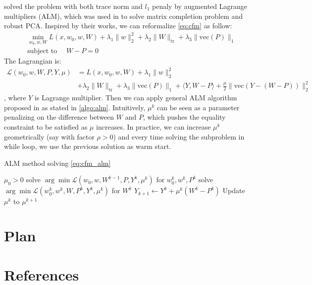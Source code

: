 \documentclass{article}
\newcommand{\tr}{\text{tr}}
\newcommand{\vecc}{\text{vec}}
\begin{document}
\cite{li2015conformal} solved the problem with both trace norm and $l_1$ penaly by augmented Lagrange multipliers (ALM), which was used in \cite{lin2010augmented} to solve matrix completion problem and robust PCA. Inspired by their works, we can reformalize \cref{eq:cfm} as follow:
\begin{align}
  &\min_{w_0, w, W} L(x, w_0, w, W) + \lambda_1 \|w\|_2^2 + \lambda_2 \|W\|_{\tr} + \lambda_3 \|\vecc(P)\|_1 \label{eq:cfm_alm} \\
  & \text{subject to }\quad W - P = 0
\end{align}
The Lagrangian is:
\begin{align}
  \mathcal{L}(w_0, w, W, P, Y, \mu) &= L(x, w_0, w, W) + \lambda_1 \|w\|_2^2 \nonumber \\
  &+ \lambda_2 \|W\|_{\tr} + \lambda_3 \|\vecc(P)\|_1 + \langle Y, W - P \rangle + \frac{\mu}{2} \|\vecc(Y - (W - P))\|_2^2 \label{eq:alm}
\end{align}
, where $Y$ is Lagrange multiplier. Then we can apply general ALM algorithm proposed in \cite{lin2010augmented} as stated in \cref{algo:alm}. Intuitively, $\mu^k$ can be seen as a parameter penalizing on the difference between $W$ and $P$, which pushes the equality constraint to be satisfied as $\mu$ increases. In practice, we can increase $\mu^k$ geometrically (say with factor $\rho > 0$) and every time solving the subproblem in while loop, we use the previous solution as warm start.
\begin{algorithm} 
  \caption{ALM method solving \cref{eq:cfm_alm}}
  \label{algo:alm}
  \begin{algorithmic}[1]
    \STATE $\mu_0 > 0$
      \STATE solve $\arg\min \mathcal{L}(w_0, w, W^{k-1}, P, Y^k, \mu^k)$ for $w_{0}^k, w^k, P^k$
      \STATE solve $\arg\min \mathcal{L}(w_{0}^k, w^k, W, P^k, Y^k, \mu^k)$ for $W^k$
      \STATE $Y_{k + 1} \leftarrow Y^{k} + \mu^k (W^k - P^k)$
      \STATE Update $\mu^k$ to $\mu^{k+1}$
    \ENDWHILE
  \end{algorithmic}
\end{algorithm}



\section{Plan}


\section*{References}
\small{
\renewcommand{\section}[2]{}%
 

}
\end{document}
